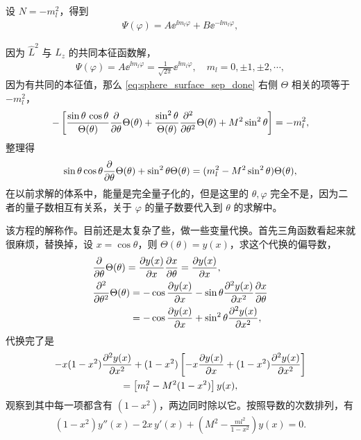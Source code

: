设 $N = - m_l^2$，得到
\begin{align}
    \Psi(\varphi) = A \ee^{\ii m_l \varphi} + B \ee^{-\ii m_l \varphi},
\end{align}

因为
$\hat L^2$ 与 $\hat L_z$ 的共同本征函数解，
\begin{align}
    \Psi(\varphi) = A \ee^{\ii m_l \varphi} = \frac1{\sqrt{2\pi}} \ee^{\ii m_l \varphi}, \quad m_l = 0, \pm1, \pm2, \cdots,
\end{align}
因为有共同的本征值，那么 \eqref{eq:sphere_surface_sep_done} 右侧 $\Theta$ 相关的项等于 $-m_l^2$，
\begin{align}
    - \left[
        \frac{\sin\theta\,\cos\theta}{\Theta(\theta)} \pdv{\theta} \Theta(\theta) + \frac {\sin^2\theta}{\Theta(\theta)} \pdv[2]{\theta} \Theta(\theta) + M^2 \sin^2\theta
    \right] = -m_l^2,
\end{align}
整理得
\begin{align}
    \sin\theta\cos\theta \pdv{\theta} \Theta(\theta) + \sin^2\theta \Theta(\theta) = (m_l^2 - M^2 \sin^2\theta) \Theta(\theta),
\end{align}
在以前求解的体系中，能量是完全量子化的，但是这里的 $\theta,\varphi$ 完全不是，因为二者的量子数相互有关系，关于 $\varphi$ 的量子数要代入到 $\theta$ 的求解中。

该方程的解称作。目前还是太复杂了些，做一些变量代换。首先三角函数看起来就很麻烦，替换掉，设 $x = \cos\theta$，则 $\Theta(\theta) = y(x)$，求这个代换的偏导数，
\begin{align}
    &\pdv{\theta}\Theta(\theta) = \pdv{y(x)}{x} \pdv{x}{\theta} = \pdv{y(x)}{x}(-\sin\theta),\\
    &\pdv[2]{\theta} \Theta(\theta ) = 
    -\cos \pdv{y(x)}{x} - \sin\theta \pdv[2]{y(x)}{x} \pdv{x}{\theta} \\
    &\phantom{\pdv[2]{\theta} \Theta(\theta )} = 
    -\cos \pdv{y(x)}{x} + \sin^2\theta \pdv[2]{y(x)}{x}, 
\end{align}
代换完了是
\begin{multline}
    - x(1-x^2) \pdv[2]{y(x)}{x} + (1-x^2) \left[
        -x \pdv{y(x)}{x} + (1-x^2) \pdv[2]{y(x)}{x}
    \right] \\= \left[m_l^2 - M^2(1-x^2)\right] y(x),
\end{multline}
观察到其中每一项都含有 $(1-x^2)$，两边同时除以它。按照导数的次数排列，有
\begin{align}
    (1-x^2) y''(x) - 2x\, y'(x) + \left(M^2 - \frac{ml^2}{1-x^2}\right) y(x) = 0.
    \label{eq:legendre_ordered} %
\end{align}

